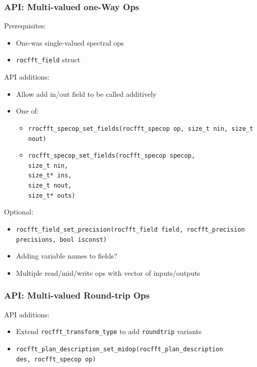 \documentclass[10pt,aspectratio=169]{beamer}
\begin{document}
\begin{frame}
  \frametitle{API: Multi-valued one-Way Ops}
  
  Prerequisites:
  \begin{itemize}
  \item One-was single-valued spectral ops
  \item \texttt{rocfft_field} struct
  \end{itemize}
  
  \bigskip

  API additions:
  \begin{itemize}
    \item Allow add in/out field to be called additively
    \item One of:
    \begin{itemize}
  \item \lstinline{rrocfft_specop_set_fields(rocfft_specop op, size_t nin, size_t nout)}
  \item \lstinline{rocfft_specop_set_fields(rocfft_specop specop,
                                                     size_t nin,
                                                     size_t* ins,
                                                     size_t nout,
                                                     size_t* outs)}
    \end{itemize}
  \end{itemize}

  \bigskip

    
  Optional:
  \begin{itemize}
  \item \lstinline{rocfft_field_set_precision(rocfft_field field, rocfft_precision precisions, bool isconst)}
  \item Adding variable names to fields?
  \item Multiple read/mid/write ops with vector of inputs/outputs
  \end{itemize}

\end{frame}


\begin{frame}
  \frametitle{API: Multi-valued Round-trip Ops}

  API additions:
  \begin{itemize}
  \item Extend \lstinline{rocfft_transform_type} to add
    \lstinline{roundtrip} variants
  \item
    \lstinline{rocfft_plan_description_set_midop(rocfft_plan_description
      des, rocfft_specop op)}
  \end{itemize}

  \medskip

    
\end{frame}
  
\end{document}
